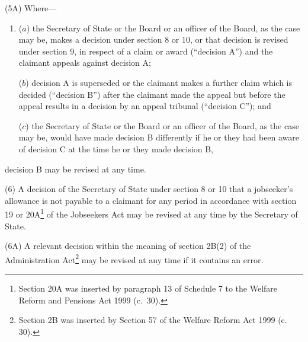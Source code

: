\documentclass[12pt,a4paper]{article}
\begin{document}
(5A) Where—
\begin{enumerate}\item[]
($a$) the Secretary of State or the Board or an officer of the Board, as the case may be, makes a decision under section 8 or 10, or that decision is revised under section 9, in respect of a claim or award (“decision A”) and the claimant appeals against decision A;

($b$) decision A is superseded or the claimant makes a further claim which is decided (“decision B”) after the claimant made the appeal but before the appeal results in a decision by an appeal tribunal (“decision C”); and

($c$) the Secretary of State or the Board or an officer of the Board, as the case may be, would have made decision B differently if he or they had been aware of decision C at the time he or they made decision B,
\end{enumerate}
decision B may be revised at any time.

(6) A decision of the Secretary of State under section 8 or 10 that a jobseeker’s allowance is not payable to a claimant for any period in accordance with section 19 
or 20A\footnote{Section 20A was inserted by paragraph 13 of Schedule 7 to the Welfare Reform and Pensions Act 1999 (c.\ 30).}  %
of the Jobseekers Act may be revised at any time by the Secretary of State.

(6A) A relevant decision within the meaning of section 2B(2) of the Administration Act\footnote{\frenchspacing Section 2B was inserted by Section 57 of the Welfare Reform Act 1999 (c. 30).} may be revised at any time if it contains an error.

%

%
\end{document}

